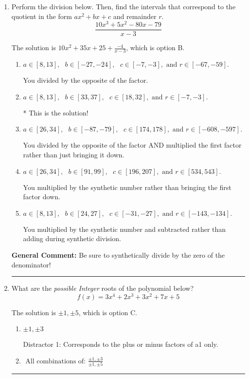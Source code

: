 \documentclass{extbook}[14pt]
\newcommand{\litem}[1]{\item #1

\rule{\textwidth}{0.4pt}}
\begin{document}
\begin{enumerate}\litem{
Perform the division below. Then, find the intervals that correspond to the quotient in the form $ax^2+bx+c$ and remainder $r$.
\[ \frac{10x^{3} +5 x^{2} -80 x -79}{x -3} \]

The solution is \( 10x^{2} +35 x + 25 + \frac{-4}{x -3} \), which is option B.\begin{enumerate}[label=\Alph*.]
\item \( a \in [8, 13], \text{   } b \in [-27, -24], \text{   } c \in [-7, -3], \text{   and   } r \in [-67, -59]. \)

 You divided by the opposite of the factor.
\item \( a \in [8, 13], \text{   } b \in [33, 37], \text{   } c \in [18, 32], \text{   and   } r \in [-7, -3]. \)

* This is the solution!
\item \( a \in [26, 34], \text{   } b \in [-87, -79], \text{   } c \in [174, 178], \text{   and   } r \in [-608, -597]. \)

 You divided by the opposite of the factor AND multiplied the first factor rather than just bringing it down.
\item \( a \in [26, 34], \text{   } b \in [91, 99], \text{   } c \in [196, 207], \text{   and   } r \in [534, 543]. \)

 You multiplied by the synthetic number rather than bringing the first factor down.
\item \( a \in [8, 13], \text{   } b \in [24, 27], \text{   } c \in [-31, -27], \text{   and   } r \in [-143, -134]. \)

 You multiplied by the synthetic number and subtracted rather than adding during synthetic division.
\end{enumerate}

\textbf{General Comment:} Be sure to synthetically divide by the zero of the denominator!
}
\litem{
What are the \textit{possible Integer} roots of the polynomial below?
\[ f(x) = 3x^{4} +2 x^{3} +3 x^{2} +7 x + 5 \]

The solution is \( \pm 1,\pm 5 \), which is option C.\begin{enumerate}[label=\Alph*.]
\item \( \pm 1,\pm 3 \)

 Distractor 1: Corresponds to the plus or minus factors of a1 only.
\item \( \text{ All combinations of: }\frac{\pm 1,\pm 3}{\pm 1,\pm 5} \)


\end{enumerate}}
\end{enumerate}
\end{document}

